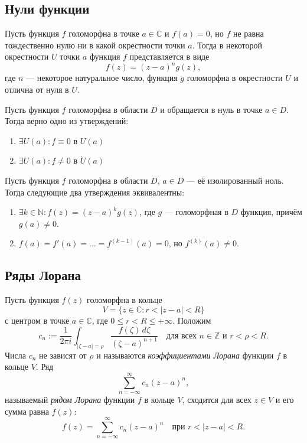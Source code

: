 \subsection{Нули функции}

\begin{theorem}
Пусть функция $f$ голоморфна в точке $a \in \mathbb{C}$ и $f(a) = 0$, но $f$ не равна тождественно нулю ни в какой окрестности точки $a$. Тогда в некоторой окрестности $U$ точки $a$ функция $f$ представляется в виде
\[
f(z) = (z - a)^n g(z),
\]
где $n$ — некоторое натуральное число, функция $g$ голоморфна в окрестности $U$ и отлична от нуля в $U$.
\end{theorem}

\begin{theorem}
Пусть функция $f$ голоморфна в области $D$ и обращается в нуль в точке $a \in D$. Тогда верно одно из утверждений:
\begin{enumerate}
  \item $\exists U(a)\colon f \equiv 0$ в $U(a)$
  \item $\exists U(a)\colon f \neq 0$ в $\mathring{U}(a)$
\end{enumerate}
\end{theorem}

\begin{theorem}
Пусть функция $f$ голоморфна в области $D$, $a \in D$ --- её изолированный ноль. Тогда следующие два утверждения эквивалентны:

\begin{enumerate}
    \item $\exists k \in \mathbb{N}\colon f(z) = (z-a)^k g(z)$, где $g$ --- голоморфная в $D$ функция, причём $g(a) \neq 0$.
    \item $f(a) = f'(a) = \dots = f^{(k-1)}(a) = 0$, но $f^{(k)}(a) \neq 0$.
\end{enumerate}
\end{theorem}

\subsection{Ряды Лорана}

\begin{theorem}
Пусть функция $f(z)$ голоморфна в кольце
\[
V = \{ z \in \mathbb{C} : r < |z - a| < R \}
\]
с центром в точке $a \in \mathbb{C}$, где $0 \leq r < R \leq +\infty$. Положим
\[
c_n := \frac{1}{2\pi i} \int_{|\zeta - a| = \rho} \frac{f(\zeta) \, d\zeta}{(\zeta - a)^{n+1}} \quad \text{для всех } n \in \mathbb{Z} \text{ и } r < \rho < R.
\]
Числа $c_n$ не зависят от $\rho$ и называются \emph{коэффициентами Лорана} функции $f$ в кольце $V$. Ряд
\[
\sum_{n=-\infty}^{\infty} c_n (z - a)^n,
\]
называемый \emph{рядом Лорана} функции $f$ в кольце $V$, сходится для всех $z \in V$ и его сумма равна $f(z)$:
\[
f(z) = \sum_{n=-\infty}^{\infty} c_n (z - a)^n \quad \text{при } r < |z - a| < R.
\]
\end{theorem}

